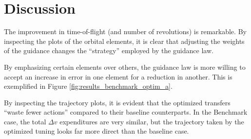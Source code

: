 \chapter{Discussion}
\label{chp:discussion}
The improvement in time-of-flight (and number of revolutions) is remarkable. By inspecting the plots of the orbital elements, it is clear that adjusting the weights of the guidance changes the ``strategy'' employed by the guidance law.

By emphasizing certain elements over others, the guidance law is more willing to accept an increase in error in one element for a reduction in another. This is exemplified in Figure \ref{fig:results_benchmark_optim_a}.

By inspecting the trajectory plots, it is evident that the optimized transfers ``waste fewer actions'' compared to their baseline counterparts. In the Benchmark case, the total $\Delta v$ expenditures are very similar, but the trajectory taken by the optimized tuning looks far more direct than the baseline case.